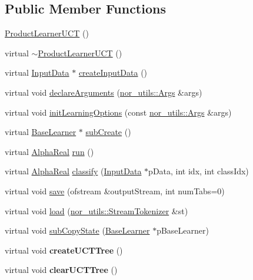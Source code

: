 \subsection*{Public Member Functions}
\begin{DoxyCompactItemize}
\item 
\hyperlink{classMultiBoost_1_1ProductLearnerUCT_add6b40498d2e5e92cf11e704a74040ee}{ProductLearnerUCT} ()
\item 
virtual \hyperlink{classMultiBoost_1_1ProductLearnerUCT_abeeaf5f9a5dcc5158128706917fe0b98}{$\sim$ProductLearnerUCT} ()
\item 
virtual \hyperlink{classMultiBoost_1_1InputData}{InputData} $\ast$ \hyperlink{classMultiBoost_1_1ProductLearnerUCT_a114cb105f1cf2f1d2ab9f4d477fe156f}{createInputData} ()
\item 
virtual void \hyperlink{classMultiBoost_1_1ProductLearnerUCT_a6427928d247044b055d9de4d54010461}{declareArguments} (\hyperlink{classnor__utils_1_1Args}{nor\_\-utils::Args} \&args)
\item 
virtual void \hyperlink{classMultiBoost_1_1ProductLearnerUCT_a73f300176f9ca4f836611806b837011d}{initLearningOptions} (const \hyperlink{classnor__utils_1_1Args}{nor\_\-utils::Args} \&args)
\item 
virtual \hyperlink{classMultiBoost_1_1BaseLearner}{BaseLearner} $\ast$ \hyperlink{classMultiBoost_1_1ProductLearnerUCT_a51986d674343402ad5effa74a1586f41}{subCreate} ()
\item 
virtual \hyperlink{Defaults_8h_a80184c4fd10ab70a1a17c5f97dcd1563}{AlphaReal} \hyperlink{classMultiBoost_1_1ProductLearnerUCT_a15651ecc0e1cbb858a4c0a02f0bc5d96}{run} ()
\item 
virtual \hyperlink{Defaults_8h_a80184c4fd10ab70a1a17c5f97dcd1563}{AlphaReal} \hyperlink{classMultiBoost_1_1ProductLearnerUCT_af9dbabc7a4a2a0cc584448db7d959be5}{classify} (\hyperlink{classMultiBoost_1_1InputData}{InputData} $\ast$pData, int idx, int classIdx)
\item 
virtual void \hyperlink{classMultiBoost_1_1ProductLearnerUCT_a6242441aa8eafd7a178a3c814bffff94}{save} (ofstream \&outputStream, int numTabs=0)
\item 
virtual void \hyperlink{classMultiBoost_1_1ProductLearnerUCT_a59953dd5aff96535cd206b9c0275709c}{load} (\hyperlink{classnor__utils_1_1StreamTokenizer}{nor\_\-utils::StreamTokenizer} \&st)
\item 
virtual void \hyperlink{classMultiBoost_1_1ProductLearnerUCT_afd69805ce174d2e4b8c5de51660e6aa6}{subCopyState} (\hyperlink{classMultiBoost_1_1BaseLearner}{BaseLearner} $\ast$pBaseLearner)
\item 
\hypertarget{classMultiBoost_1_1ProductLearnerUCT_a77b347fc0d0136e54414b9260bc65e6c}{
virtual void {\bfseries createUCTTree} ()}
\label{classMultiBoost_1_1ProductLearnerUCT_a77b347fc0d0136e54414b9260bc65e6c}

\item 
\hypertarget{classMultiBoost_1_1ProductLearnerUCT_a51032b3664a7f49590cbac14e907d6c4}{
virtual void {\bfseries clearUCTTree} ()}
\label{classMultiBoost_1_1ProductLearnerUCT_a51032b3664a7f49590cbac14e907d6c4}

\end{DoxyCompactItemize}
